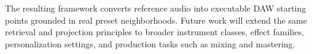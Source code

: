 The resulting framework converts reference audio into executable DAW starting points grounded in real preset neighborhoods. Future work will extend the same retrieval and projection principles to broader instrument classes, effect families, personalization settings, and production tasks such as mixing and mastering.


\begingroup
\sloppy
\raggedright
{}

\endgroup
